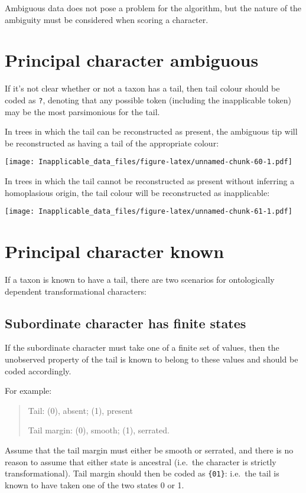 \documentclass[]{book}
\theoremstyle{definition}
\theoremstyle{definition}
\theoremstyle{definition}
\theoremstyle{remark}
\begin{document}
Ambiguous data does not pose a problem for the algorithm, but the nature
of the ambiguity must be considered when scoring a character.

\section{Principal character
ambiguous}\label{principal-character-ambiguous}

If it's not clear whether or not a taxon has a tail, then tail colour
should be coded as \texttt{?}, denoting that any possible token
(including the inapplicable token) may be the most parsimonious for the
tail.

In trees in which the tail can be reconstructed as present, the
ambiguous tip will be reconstructed as having a tail of the appropriate
colour:

\texttt{[image: Inapplicable\_data\_files/figure-latex/unnamed-chunk-60-1.pdf]}

In trees in which the tail cannot be reconstructed as present without
inferring a homoplasious origin, the tail colour will be reconstructed
as inapplicable:

\texttt{[image: Inapplicable\_data\_files/figure-latex/unnamed-chunk-61-1.pdf]}

\section{Principal character known}\label{principal-character-known}

If a taxon is known to have a tail, there are two scenarios for
ontologically dependent transformational characters:

\subsection{Subordinate character has finite
states}\label{subordinate-character-has-finite-states}

If the subordinate character must take one of a finite set of values,
then the unobserved property of the tail is known to belong to these
values and should be coded accordingly.

For example:

\begin{quote}
Tail: (0), absent; (1), present

Tail margin: (0), smooth; (1), serrated.
\end{quote}

Assume that the tail margin must either be smooth or serrated, and there
is no reason to assume that either state is ancestral (i.e.~the
character is strictly transformational). Tail margin should then be
coded as \texttt{\{01\}}: i.e.~the tail is known to have taken one of
the two states 0 or 1.
\end{document}

